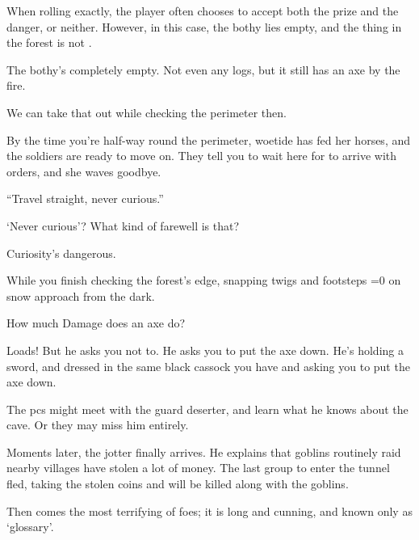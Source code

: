 \begin{multicols}{2}
\vspace{\baselineskip}
\noindent
When rolling  exactly, the player often chooses to accept both the prize and the danger, or neither.
However, in this case, the \gls{bothy} lies empty, and the thing in the forest is not .

\vspace{\baselineskip}
\bigLine

\begin{description}\sf
  \item[\Gls{gm}:]
  The \gls{bothy}'s completely empty.
  Not even any logs, but it still has an axe by the fire.
  \item[Player 1:]
  We can take that out while checking the perimeter then.
  \item[\Gls{gm}:]
  By the time you're half-way round the perimeter, \gls{woetide} has fed her horses, and the \glspl{soldier} are ready to move on.
  They tell you to wait here for  to arrive with orders, and she waves goodbye.

  ``Travel straight, never curious.''
  \item[Player 2:]
  `Never curious'?
  What kind of farewell is that?
  \item[Player 1:]
  Curiosity's dangerous.

  \item[\Gls{gm}:]
  While you finish checking the forest's edge, snapping twigs and footsteps
  \ifnum\value{temperature}=0%
    on snow
  \fi%
  approach from the dark.
  \item[Player 2:]
  How much Damage does an axe do?
  \item[\Glsentrytext{gm}:]
  Loads!
  But he asks you not to.
  He asks you to put the axe down.
  He's holding a sword, and dressed in the same black cassock you have and asking you to put the axe down.
\end{description}

\bigLine\nobreak
\vspace{2em}
\noindent
The \glspl{pc} might meet with the \gls{guard} deserter, and learn what he knows about the cave.
Or they may miss him entirely.

Moments later, the \gls{jotter} finally arrives.
He explains that goblins routinely raid nearby \glspl{village} have stolen a lot of money.
The last group to enter the tunnel fled, taking the stolen \glspl{coin} and will be killed along with the goblins.

Then comes the most terrifying of foes; it is long and cunning, and known only as `glossary'.

\end{multicols}
